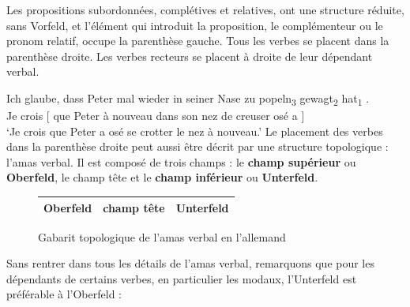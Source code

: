 {    Les propositions subordonnées, complétives et relatives, ont une structure réduite, sans Vorfeld, et l’élément qui introduit la proposition, le complémenteur ou le pronom relatif, occupe la parenthèse gauche. Tous les verbes se placent dans la parenthèse droite. Les verbes recteurs se placent à droite de leur dépendant verbal.

    \ea
    \gll  Ich glaube,   {\ob} dass Peter mal wieder in seiner Nase zu popeln\textsubscript{3} gewagt\textsubscript{2} hat\textsubscript{1}   {\cb}.\\
    Je crois   [ que  Peter à nouveau dans son nez   de creuser  osé        a   ]\\
    \glt ‘Je crois que Peter a osé se crotter le nez à nouveau.’
    \z
    Le placement des verbes dans la parenthèse droite peut aussi être décrit par une structure topologique : l’amas verbal. Il est composé de trois champs : le \textbf{champ supérieur} ou \textbf{Oberfeld}, le champ tête et le \textbf{champ inférieur} ou \textbf{Unterfeld}.

    \begin{figure}
    \def\arraystretch{1.5}
    \setlength{\tabcolsep}{4ex}
    \begin{tabular}{|c|c|c|}
    \hline
    Oberfeld & champ tête & Unterfeld\\
    \hline
    \end{tabular}
    \caption{Gabarit topologique de l'amas verbal en l'allemand}
    \end{figure}
    
    Sans rentrer dans tous les détails de l’amas verbal, remarquons que pour les dépendants de certains verbes, en particulier les modaux, l’Unterfeld est préférable à l’Oberfeld :

    \ea\label{ex:popel}
    \z
    \z

}
